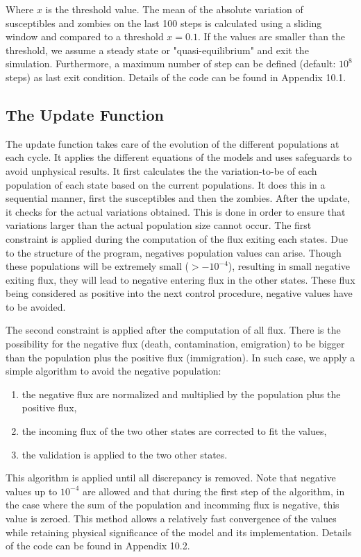 \documentclass[11pt]{article} %
\begin{document}
Where $x$ is the threshold value. The mean of the absolute variation of susceptibles and zombies on the last 100 steps is calculated using a sliding window and compared to a threshold $x = 0.1$. If the values are smaller than the threshold, we assume a steady state or "quasi-equilibrium" and exit the simulation. Furthermore, a maximum number of step can be defined (default: $10^8$ steps) as last exit condition. Details of the code can be found in Appendix 10.1.

\subsection{The Update Function}\indent

The update function takes care of the evolution of the different populations at each cycle. It applies the different equations of the models and uses safeguards to avoid unphysical results. It first calculates the the variation-to-be of each population of each state based on the current populations. It does this in a sequential manner, first the susceptibles and then the zombies. After the update, it checks for the actual variations obtained. This is done in order to ensure that variations larger than the actual population size cannot occur.
The first constraint is applied during the computation of the flux exiting each states. Due to the structure of the program, negatives population values can arise. Though these populations will be extremely small ($> - 10^{-4}$), resulting in small negative exiting flux, they will lead to negative entering flux in the other states. These flux being considered as positive into the next control procedure, negative values have to be avoided.

The second constraint is applied after the computation of all flux. There is the possibility for the negative flux (death, contamination, emigration) to be bigger than the population plus the positive flux (immigration). In such case, we apply a simple algorithm to avoid the negative population:
\begin{enumerate}
	\item the negative flux are normalized and multiplied by the population plus the positive flux,
	\item the incoming flux of the two other states are corrected to fit the values,
	\item the validation is applied to the two other states.
\end{enumerate}
This algorithm is applied until all discrepancy is removed. Note that negative values up to $10^{-4}$ are allowed and that during the first step of the algorithm, in the case where the sum of the population and incomming flux is negative, this value is zeroed. This method allows a relatively fast convergence of the values while retaining physical significance of the model and its implementation. Details of the code can be found in Appendix 10.2.
\end{document}
